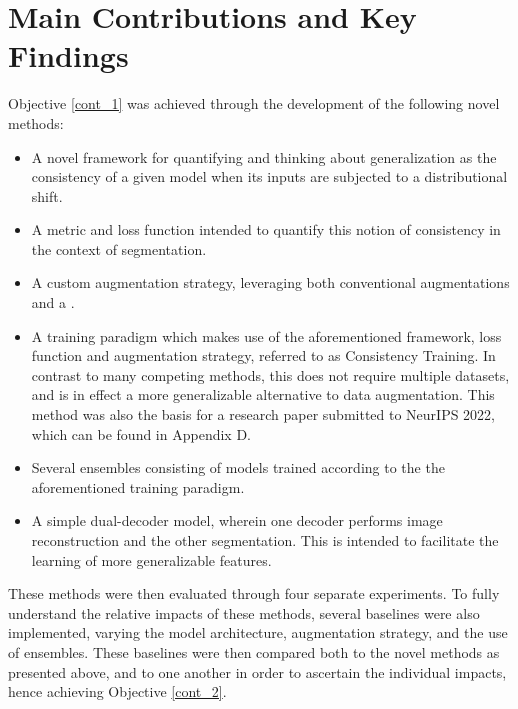     \section{Main Contributions and Key Findings}
    Objective \ref{cont_1} was achieved through the development of the following novel methods:
    \begin{itemize}
        \item A novel framework for quantifying and thinking about generalization as the consistency of a given model when its inputs are subjected to a distributional shift.
        \item A metric and loss function intended to quantify this notion of consistency in the context of segmentation.
        \item A custom augmentation strategy, leveraging both conventional augmentations and a .
        \item A training paradigm which makes use of the aforementioned framework, loss function and augmentation strategy, referred to as Consistency Training. In contrast to many competing methods, this does not require multiple datasets, and is in effect a more generalizable alternative to data augmentation. This method was also the basis for a research paper submitted to NeurIPS 2022, which can be found in Appendix D.
        \item Several ensembles consisting of models trained according to the the aforementioned training paradigm.
        \item A simple dual-decoder model, wherein one decoder performs image reconstruction and the other segmentation. This is intended to facilitate the learning of more generalizable features.
    \end{itemize}
    
    These methods were then evaluated through four separate experiments. To fully understand the relative impacts of these methods, several baselines were also implemented, varying the model architecture, augmentation strategy, and the use of ensembles. These baselines were then compared both to the novel methods as presented above, and to one another in order to ascertain the individual impacts, hence achieving Objective \ref{cont_2}.
    
